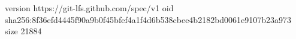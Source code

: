 version https://git-lfs.github.com/spec/v1
oid sha256:8f36efd4445f90a9b0f45bfef4a1f4d6b538cbee4b2182bd0061e9107b23a973
size 21884
